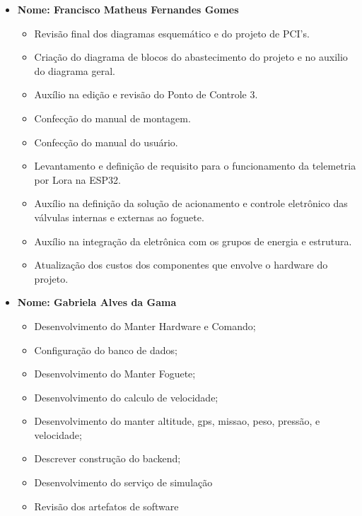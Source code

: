 \begin{itemize}
    
    \item \textbf{Nome: Francisco Matheus Fernandes Gomes}
    \begin{itemize}
     \item Revisão final dos diagramas esquemático e do projeto de PCI's.
    \item Criação do diagrama de blocos do abastecimento do projeto e no auxilio do diagrama geral.
    \item Auxílio na edição e revisão do Ponto de Controle 3.
    \item Confecção do manual de montagem.
    \item Confecção do manual do usuário.
   \item Levantamento e definição de requisito para o funcionamento da telemetria por Lora na ESP32.
   \item Auxílio na definição da solução de acionamento e controle eletrônico das válvulas internas e externas ao foguete.
    \item Auxílio na integração da eletrônica com os grupos de energia e estrutura.
    \item Atualização dos custos dos componentes que envolve o hardware do projeto.
    \end{itemize}
    
    \item \textbf{Nome: Gabriela Alves da Gama}
    \begin{itemize}
     \item Desenvolvimento do Manter Hardware e Comando;
    \item Configuração do banco de dados;
    \item Desenvolvimento do Manter Foguete;
    \item Desenvolvimento do calculo de velocidade;
    \item Desenvolvimento do manter altitude, gps, missao, peso, pressão, e velocidade; 
    \item Descrever construção do backend;
    \item Desenvolvimento do serviço de simulação
    \item Revisão dos artefatos de software
    \end{itemize}


\end{itemize}
